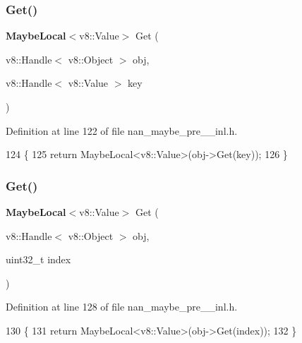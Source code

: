\subsubsection{Get()\hspace{0.1cm}{\footnotesize\ttfamily [1/2]}}
{\footnotesize\ttfamily \textbf{ Maybe\+Local}$<$v8\+::\+Value$>$ Get (\begin{DoxyParamCaption}\item[{v8\+::\+Handle$<$ v8\+::\+Object $>$}]{obj,  }\item[{v8\+::\+Handle$<$ v8\+::\+Value $>$}]{key }\end{DoxyParamCaption})}



Definition at line 122 of file nan\+\_\+maybe\+\_\+pre\+\_\+\_\+inl.\+h.


\begin{DoxyCode}
124                            \{
125   \textcolor{keywordflow}{return} MaybeLocal<v8::Value>(obj->Get(key));
126 \}
\end{DoxyCode}
\mbox{\label{nan__maybe__pre__43__inl_8h_ab993921df16898055684b08fecd8b3db}} 
\subsubsection{Get()\hspace{0.1cm}{\footnotesize\ttfamily [2/2]}}
{\footnotesize\ttfamily \textbf{ Maybe\+Local}$<$v8\+::\+Value$>$ Get (\begin{DoxyParamCaption}\item[{v8\+::\+Handle$<$ v8\+::\+Object $>$}]{obj,  }\item[{uint32\+\_\+t}]{index }\end{DoxyParamCaption})}



Definition at line 128 of file nan\+\_\+maybe\+\_\+pre\+\_\+\_\+inl.\+h.


\begin{DoxyCode}
130                     \{
131   \textcolor{keywordflow}{return} MaybeLocal<v8::Value>(obj->Get(index));
132 \}
\end{DoxyCode}
\mbox{\label{nan__maybe__pre__43__inl_8h_af6c285debe9b1a7fde7c95b3df8d6ce5}} 
